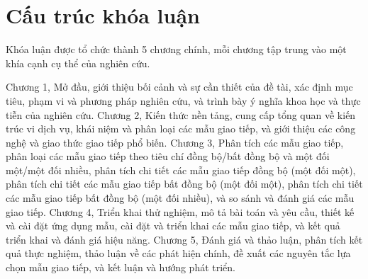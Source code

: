 \section{Cấu trúc khóa luận}
Khóa luận được tổ chức thành 5 chương chính, mỗi chương tập trung vào một khía cạnh cụ thể của nghiên cứu. 

Chương 1, Mở đầu, giới thiệu bối
cảnh và sự cần thiết của đề tài, xác định mục tiêu, phạm vi và phương pháp
nghiên cứu, và trình bày ý nghĩa khoa học và thực tiễn của nghiên cứu. Chương 2, Kiến thức nền tảng, cung cấp tổng quan về kiến trúc vi dịch vụ, khái niệm và
phân loại các mẫu giao tiếp, và giới thiệu các công nghệ và giao thức giao tiếp
phổ biến. Chương 3, Phân tích các mẫu giao tiếp, phân loại các mẫu giao tiếp
theo tiêu chí đồng bộ/bất đồng bộ và một đối một/một đối nhiều, phân tích chi tiết
các mẫu giao tiếp đồng bộ (một đối một), phân tích chi tiết các mẫu giao tiếp
bất đồng bộ (một đối một), phân tích chi tiết các mẫu giao tiếp bất đồng bộ
(một đối nhiều), và so sánh và đánh giá các mẫu giao tiếp. Chương 4, Triển khai
thử nghiệm, mô tả bài toán và yêu cầu, thiết kế và cài đặt ứng dụng mẫu, cài
đặt và triển khai các mẫu giao tiếp, và kết quả triển khai và đánh giá hiệu
năng. Chương 5, Đánh giá và thảo luận, phân tích kết quả thực nghiệm, thảo luận
về các phát hiện chính, đề xuất các nguyên tắc lựa chọn mẫu giao tiếp, và kết
luận và hướng phát triển.